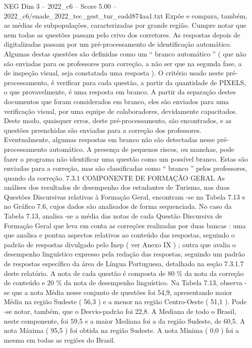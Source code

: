 \begin{textsample}{NEG Dim 3 – 2022\_c6 – Score 5.00 – 2022\_c6/enade\_2022\_tec\_gest\_tur\_eadd874aa1.txt}
Expõe e compara, também, as médias de subpopulações, caracterizadas por grande região.
Cumpre notar que nem todas as questões passam pelo crivo dos corretores.
As respostas depois de digitalizadas passam por um pré-processamento de identificação automático.
Algumas destas questões são definidas como um “ branco automático ” ( que não são enviadas para os professores para correção, a não ser que na segunda fase, a de inspeção visual, seja constatada uma resposta ).
O critério usado neste pré-processamento, é verificar para cada questão, a partir da quantidade de PIXELS, o que provavelmente, é uma resposta em branco.
A partir da separação destes documentos que foram considerados em branco, eles são enviados para uma verificação visual, por uma equipe de colaboradores, devidamente capacitados.
Deste modo, quaisquer erros, deste pré-processamento, são encontrados, e as questões preenchidas são enviadas para a correção dos professores.
Eventualmente, algumas respostas em branco não são detectadas nesse pré-processamento automático.
A presença de pequenos riscos, ou manchas, pode fazer o programa não identificar uma questão como um possível branco.
Estas são enviadas para a correção, mas são classificadas como “ branco ” pelos professores, quando da correção. 7.3.1 COMPONENTE DE FORMAÇÃO GERAL As análises dos resultados de desempenho dos estudantes de Turismo, nas duas Questões Discursivas relativas à Formação Geral, encontram -se na Tabela 7.13 e no Gráfico 7.6, cujos dados são analisados de forma sequenciada.
No caso da Tabela 7.13, analisa -se a média das notas de cada Questão Discursiva de Formação Geral que leva em conta as correções realizadas por duas bancas : uma que analisa e pontua aspectos relativos ao conteúdo das respostas, seguindo o padrão de respostas divulgado pelo Inep ( ver Anexo IX ) ; outra que avalia o desempenho linguístico expresso pela redação das respostas, seguindo um padrão de respostas específico da área de Língua Portuguesa, detalhado na seção 7.3.1.7 deste relatório.
A nota de cada questão é composta de 80 \% da nota da correção de conteúdo e 20 \% da nota de desempenho linguístico.
Na Tabela 7.13, observa -se que a nota Média nesse conjunto de questões foi 54,9, apresentando maior Média na região Sudeste ( 56,3 ) e a menor na região Centro-Oeste ( 51,1 ).
Pode -se notar, também, que o Desvio-padrão foi 22,8.
A Mediana de todo o Brasil, neste componente, foi 59,5 e a maior Mediana foi a da região Sudeste, de 60,5.
A nota Máxima ( 95,5 ) foi obtida na região Sudeste.
A nota Mínima ( 0,0 ) foi a mesma em todas as regiões do Brasil.

\end{textsample}
